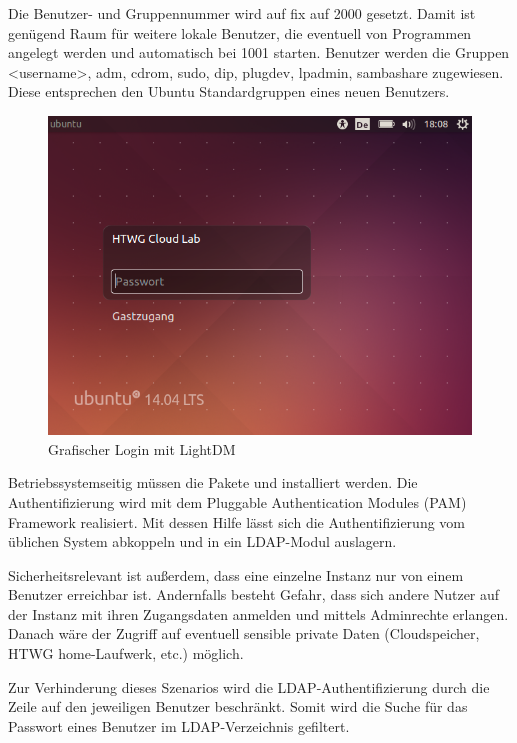 Die Benutzer- und Gruppennummer wird auf fix auf 2000 gesetzt.
Damit ist genügend Raum für weitere lokale Benutzer, die eventuell von Programmen angelegt werden und automatisch bei 1001 starten.
Benutzer werden die Gruppen <username>, adm, cdrom, sudo, dip, plugdev, lpadmin, sambashare zugewiesen. 
Diese entsprechen den Ubuntu Standardgruppen eines neuen Benutzers.

\begin{figure}[htbp]
\centering
\includegraphics[scale=0.6]{img/lightdm.png}
\caption{Grafischer Login mit LightDM}
\label{lightdm}
\end{figure}

Betriebssystemseitig müssen die Pakete  und  installiert werden. 
Die Authentifizierung wird mit dem Pluggable Authentication Modules (PAM) Framework realisiert. 
Mit dessen Hilfe lässt sich die Authentifizierung vom üblichen System abkoppeln und in ein LDAP-Modul auslagern.

Sicherheitsrelevant ist außerdem, dass eine einzelne Instanz nur von einem Benutzer erreichbar ist. 
Andernfalls besteht Gefahr, dass sich andere Nutzer auf der Instanz mit ihren Zugangsdaten anmelden und mittels  Adminrechte erlangen.
Danach wäre der Zugriff auf eventuell sensible private Daten (Cloudspeicher, HTWG home-Laufwerk, etc.) möglich.

Zur Verhinderung dieses Szenarios wird die LDAP-Authentifizierung durch die Zeile   auf den jeweiligen Benutzer beschränkt.
Somit wird die Suche für das Passwort eines Benutzer im LDAP-Verzeichnis gefiltert.

